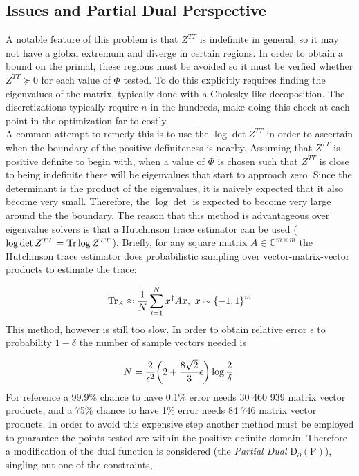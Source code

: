 \documentclass[reprint]{revtex4-2}
\begin{document}
\subsection{Issues and Partial Dual Perspective}
\label{ssec:formulation}
A notable feature of this problem is that $Z^{TT}$ is indefinite in general, so it may not have a global extremum and diverge in certain regions. In order to obtain a bound on the primal, these regions must be avoided so it must be verfied whether $Z^{TT}\succcurlyeq 0$ for each value of $\Phi$ tested. To do this explicitly requires finding the eigenvalues of the matrix, typically done with a Cholesky-like decoposition. The discretizations typically require $n$ in the hundreds, make doing this check at each point in the optimization far to costly.\\

A common attempt to remedy this is to use the $\log\det Z^{TT}$ in order to ascertain when the boundary of the positive-definiteness is nearby. Assuming that $Z^{TT}$ is positive definite to begin with, when a value of $\Phi$ is chosen such that $Z^{TT}$ is close to being indefinite there will be eigenvalues that start to approach zero. Since the determinant is the product of the eigenvalues, it is naively expected that it also become very small. Therefore, the $\log\det$ is expected to become very large around the the boundary. The reason that this method is advantageous over eigenvalue solvers is that a Hutchinson trace estimator can be used ($\log\det Z^{TT} = \Tr\log Z^{TT}$). Briefly, for any square matrix $A\in\mathbb{C}^{m\times m}$ the Hutchinson trace estimator does probabilistic sampling over vector-matrix-vector products to estimate the trace:

\begin{align}
	\Tr_A\approx\frac{1}{N}\sum_{i=1}^N x^\dagger Ax,\ x\sim\qty{-1, 1}^m
\end{align}
This method, however is still too slow. In order to obtain relative error $\epsilon$ to probability $1-\delta$ the number of sample vectors needed is \cite{skorski2021modern}

\begin{align}
	N = \frac{2}{\epsilon^2}\qty(2+\frac{8\sqrt{2}}{3}\epsilon)\log\frac{2}{\delta}.
\end{align}
For reference a 99.9\% chance to have 0.1\% error needs 30 460 939 matrix vector products, and a 75\% chance to have 1\% error needs 84 746 matrix vector products. In order to avoid this expensive step another method must be employed to guarantee the points tested are within the positive definite domain. Therefore a modification of the dual function is considered (the \emph{Partial Dual} $\text{D}_\partial(\text{P})$), singling out one of the constraints,
\end{document}
